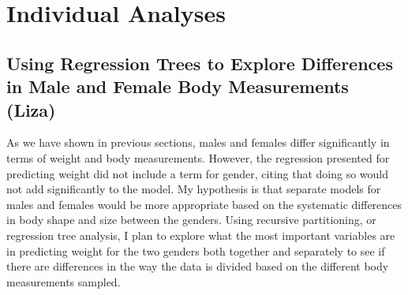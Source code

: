 \documentclass[11pt]{article}\usepackage[]{graphicx}\usepackage[]{color}
\begin{document}

\section{Individual Analyses}


\subsection{Using Regression Trees to Explore Differences in Male and Female Body Measurements (Liza)} %

As we have shown in previous sections, males and females differ significantly in terms of weight and body measurements. However, the regression presented for predicting weight did not include a term for gender, citing that doing so would not add significantly to the model. My hypothesis is that separate models for males and females would be more appropriate based on the systematic differences in body shape and size between the genders. Using recursive partitioning, or regression tree analysis, I plan to explore what the most important variables are in predicting weight for the two genders both together and separately to see if there are differences in the way the data is divided based on the different body measurements sampled.
\end{document}
